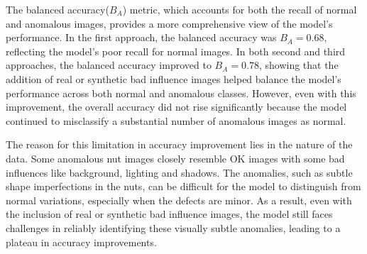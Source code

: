 \documentclass[12pt,DIV14,BCOR12mm,a4paper,footinclude=false,headinclude,parskip=half-,twoside,openright,cleardoublepage=empty,toc=index,bibliography=totoc,listof=totoc]{scrreprt}
\numberwithin{equation}{chapter}
\begin{document}
The balanced accuracy(\( B_A \)) metric, which accounts for both the recall of normal and anomalous images, provides a more comprehensive view of the model's performance. In the first approach, the balanced accuracy was \( B_A = 0.68 \), reflecting the model's poor recall for normal images. In both second and third approaches, the balanced accuracy improved to \( B_A = 0.78 \), showing that the addition of real or synthetic bad influence images helped balance the model's performance across both normal and anomalous classes. However, even with this improvement, the overall accuracy did not rise significantly because the model continued to misclassify a substantial number of anomalous images as normal.

The reason for this limitation in accuracy improvement lies in the nature of the data. Some anomalous nut images closely resemble OK images with some bad influences like background, lighting and shadows. The anomalies, such as subtle shape imperfections in the nuts, can be difficult for the model to distinguish from normal variations, especially when the defects are minor. As a result, even with the inclusion of real or synthetic bad influence images, the model still faces challenges in reliably identifying these visually subtle anomalies, leading to a plateau in accuracy improvements.
\end{document}
